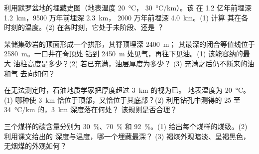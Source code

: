 \begin{exercise}[$\star\star$]\label{exo:g11:fossil-fuel-geology:8}
利用默罗盆地的埋藏史图（地表温度 \qty{20}{\degreeCelsius}，
 \qty{30}{\degreeCelsius/km}）。该
在 1.2 亿年前埋深 \qty{1.2}{km}，9500 万年前埋深 \qty{2.3}{km}，
2000 万年前埋深 \qty{4.0}{km}。(1) 计算
其在各时刻的温度。(2) 在各时刻，它处于未阶段、还是
？
\end{exercise}

\begin{exercise}[$\star\star$]\label{exo:g11:fossil-fuel-geology:9}
某储集砂岩的顶面形成一个拱形，其脊顶埋深 \qty{2400}{m}；
其最深的闭合等值线位于 \qty{2580}{m}。一口井在脊顶处
钻到 \qty{2450}{m} 处见气，再往下见油。(1) 该能容纳的最大
油柱高度是多少？(2) 若已充满，油层厚度为多少？
(3) 充满之后仍不断来的油和气
去向如何？
\end{exercise}

\begin{exercise}[$\star\star$]\label{exo:g11:fossil-fuel-geology:10}
在无法测定时，石油地质学家把厚度超过
\qty{3}{km} 的视为已。
地表温度为 \qty{20}{\degreeCelsius}。(1) 哪种使
\qty{3}{km} 恰位于顶部，又恰位于其底部？(2) 利用钻孔中测得的
25 至 \qty{34}{\degreeCelsius/km} 的，\qty{3}{km} 深度落在何处？
该规则是否合理？
\end{exercise}

\begin{exercise}[$\star\star$]\label{exo:g11:fossil-fuel-geology:11}
三个煤样的碳含量分别为 \qty{30}{\percent}、\qty{70}{\percent} 和
\qty{92}{\percent}。(1) 给出每个煤样的煤级。(2) 利用课文给出的
深度与温度，哪一个埋藏最深？
(3) 褐煤外观暗淡、呈褐黑色，无烟煤的外观如何？
\end{exercise}

